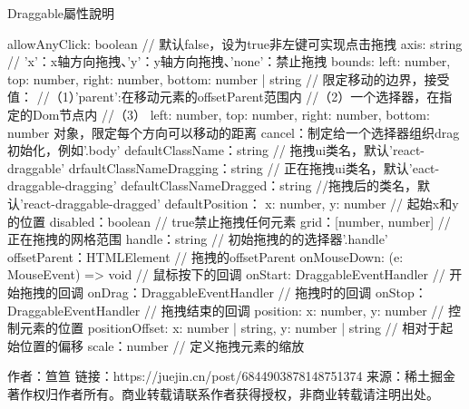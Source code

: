 Draggable屬性說明


allowAnyClick: boolean // 默认false，设为true非左键可实现点击拖拽
axis: string // 'x'：x轴方向拖拽、'y'：y轴方向拖拽、'none'：禁止拖拽
bounds: { left: number, top: number, right: number, bottom: number } | string 
    // 限定移动的边界，接受值：
    //（1）'parent':在移动元素的offsetParent范围内
    //（2）一个选择器，在指定的Dom节点内
    //（3）{ left: number, top: number, right: number, bottom: number }对象，限定每个方向可以移动的距离
cancel：制定给一个选择器组织drag初始化，例如'.body'
defaultClassName：string // 拖拽ui类名，默认'react-draggable'
drfaultClassNameDragging：string // 正在拖拽ui类名，默认'eact-draggable-dragging'
defaultClassNameDragged：string //拖拽后的类名，默认'react-draggable-dragged'
defaultPosition：{ x: number, y: number } // 起始x和y的位置
disabled：boolean // true禁止拖拽任何元素
grid：[number, number] // 正在拖拽的网格范围
handle：string  // 初始拖拽的的选择器'.handle'
offsetParent：HTMLElement // 拖拽的offsetParent
onMouseDown: (e: MouseEvent) => void // 鼠标按下的回调
onStart: DraggableEventHandler // 开始拖拽的回调
onDrag：DraggableEventHandler // 拖拽时的回调
onStop：DraggableEventHandler // 拖拽结束的回调
position: {x: number, y: number} // 控制元素的位置
positionOffset: {x: number | string, y: number | string} // 相对于起始位置的偏移
scale：number // 定义拖拽元素的缩放

作者：笪笪
链接：https://juejin.cn/post/6844903878148751374
来源：稀土掘金
著作权归作者所有。商业转载请联系作者获得授权，非商业转载请注明出处。